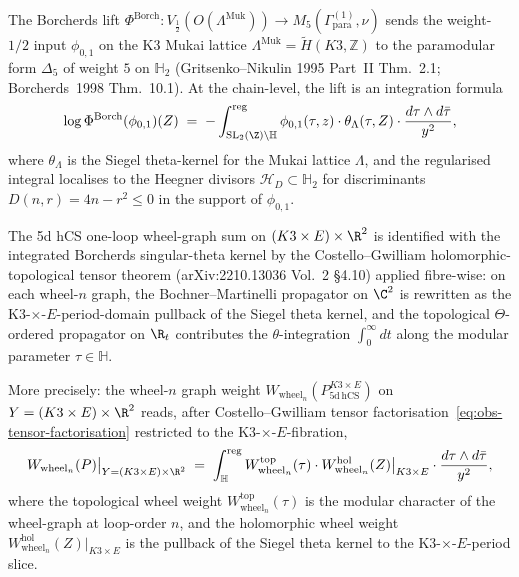 The Borcherds lift
$\Phi^{\mathrm{Borch}} : V_{\frac{1}{2}}(O(\Lambda^{\mathrm{Muk}}))
\to M_5(\Gamma_{\mathrm{para}}^{(1)}, \nu)$
sends the weight-$1/2$ input $\phi_{0,1}$ on the K3 Mukai lattice
$\Lambda^{\mathrm{Muk}} = \widetilde H(K3, \mathbb Z)$ to the paramodular
form $\Delta_5$ of weight $5$ on $\mathbb{H}_2$ (Gritsenko--Nikulin
1995 Part~II Thm.~2.1; Borcherds~1998 Thm.~10.1). At the chain-level,
the lift is an integration formula
\begin{equation}
\label{eq:borcherds-singular-theta}
 \log \Phi^{\mathrm{Borch}}(\phi_{0,1})(Z)
 \;=\; -\int^{\mathrm{reg}}_{\mathrm{SL}_2(\Z) \backslash \mathbb{H}}
 \phi_{0,1}(\tau, z) \cdot \theta_\Lambda(\tau, Z) \cdot
 \frac{d\tau \wedge d\bar\tau}{y^2},
\end{equation}
where $\theta_\Lambda$ is the Siegel theta-kernel for the Mukai lattice
$\Lambda$, and the regularised integral localises to the Heegner
divisors $\mathcal{H}_D \subset \mathbb{H}_2$ for discriminants
$D(n,r) = 4n - r^2 \leq 0$ in the support of $\phi_{0,1}$.

The 5d hCS one-loop wheel-graph sum on
$(K3 \times E) \times \R^2$ is identified with the integrated Borcherds
singular-theta kernel by the Costello--Gwilliam holomorphic-topological
tensor theorem (arXiv:2210.13036 Vol.~2 §4.10) applied fibre-wise: on
each wheel-$n$ graph, the Bochner--Martinelli propagator on $\C^2$ is
rewritten as the K3-$\times$-$E$-period-domain pullback of the
Siegel theta kernel, and the topological $\Theta$-ordered propagator
on $\R_t$ contributes the $\theta$-integration $\int^\infty_0 dt$ along
the modular parameter $\tau \in \mathbb{H}$.

More precisely: the wheel-$n$ graph weight
$W_{\mathrm{wheel}_n}(P_{5\mathrm{d\,hCS}}^{K3 \times E})$ on
$Y = (K3 \times E) \times \R^2$ reads, after Costello--Gwilliam
tensor factorisation~\eqref{eq:obs-tensor-factorisation} restricted to
the K3-$\times$-$E$-fibration,
\begin{equation}
\label{eq:wheel-weight-localised}
 W_{\mathrm{wheel}_n}(P)\big|_{Y=(K3\times E)\times\R^2}
 \;=\; \int^{\mathrm{reg}}_{\mathbb{H}}
 W_{\mathrm{wheel}_n}^{\mathrm{top}}(\tau) \cdot
 W_{\mathrm{wheel}_n}^{\mathrm{hol}}(Z)\big|_{K3 \times E} \cdot
 \frac{d\tau \wedge d\bar\tau}{y^2},
\end{equation}
where the topological wheel weight
$W_{\mathrm{wheel}_n}^{\mathrm{top}}(\tau)$ is the modular character of
the wheel-graph at loop-order $n$, and the holomorphic wheel weight
$W_{\mathrm{wheel}_n}^{\mathrm{hol}}(Z)\big|_{K3 \times E}$ is the
pullback of the Siegel theta kernel to the K3-$\times$-$E$-period
slice.

